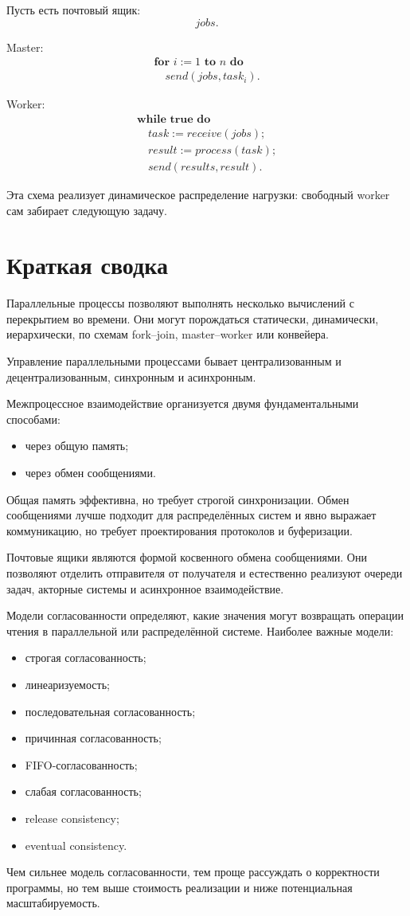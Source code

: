 \documentclass[12pt,a4paper]{article}
\begin{document}
Пусть есть почтовый ящик:
\[
jobs.
\]

Master:
\[
\begin{array}{l}
\textbf{for } i := 1 \textbf{ to } n \textbf{ do}\\
\quad send(jobs, task_i).
\end{array}
\]

Worker:
\[
\begin{array}{l}
\textbf{while true do}\\
\quad task := receive(jobs);\\
\quad result := process(task);\\
\quad send(results, result).
\end{array}
\]

Эта схема реализует динамическое распределение нагрузки: свободный worker сам забирает следующую задачу.

\section{Краткая сводка}

Параллельные процессы позволяют выполнять несколько вычислений с перекрытием во времени. Они могут порождаться статически, динамически, иерархически, по схемам fork--join, master--worker или конвейера.

Управление параллельными процессами бывает централизованным и децентрализованным, синхронным и асинхронным.

Межпроцессное взаимодействие организуется двумя фундаментальными способами:
\begin{itemize}
    \item через общую память;
    \item через обмен сообщениями.
\end{itemize}

Общая память эффективна, но требует строгой синхронизации. Обмен сообщениями лучше подходит для распределённых систем и явно выражает коммуникацию, но требует проектирования протоколов и буферизации.

Почтовые ящики являются формой косвенного обмена сообщениями. Они позволяют отделить отправителя от получателя и естественно реализуют очереди задач, акторные системы и асинхронное взаимодействие.

Модели согласованности определяют, какие значения могут возвращать операции чтения в параллельной или распределённой системе. Наиболее важные модели:
\begin{itemize}
    \item строгая согласованность;
    \item линеаризуемость;
    \item последовательная согласованность;
    \item причинная согласованность;
    \item FIFO-согласованность;
    \item слабая согласованность;
    \item release consistency;
    \item eventual consistency.
\end{itemize}

Чем сильнее модель согласованности, тем проще рассуждать о корректности программы, но тем выше стоимость реализации и ниже потенциальная масштабируемость.
\end{document}
